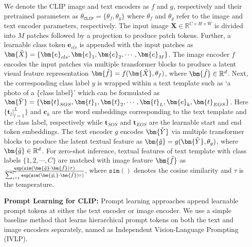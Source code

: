 \documentclass[10pt,twocolumn,letterpaper]{article}
\begin{document}
We denote the CLIP image and text encoders as ${f}$ and ${g}$, respectively and their pretrained parameters as ${\theta}_{\mathtt{CLIP}} = \{\theta_{f}, \theta_{g} \}$ where $\theta_{f}$ and $\theta_{g}$ refer to the image and text encoder parameters, respectively. The input image $\bm{X} \in \mathbb{R}^{C\times H\times W}$ is divided into $M$ patches followed by a projection to produce patch tokens.  Further, a learnable class token $\bm{e}_{cls}$ is appended with the input patches as $\bm{\Tilde{X}}= \{\bm{e}_{cls}, \bm{e}_{1}, \bm{e}_{2}, \cdots, \bm{e}_{M}\}$.
The image encoder ${f}$ encodes the input patches via multiple transformer blocks to produce a latent visual feature representation $\bm{\Tilde{f}} = f(\bm{\Tilde{X}}, \theta_{f})$, where $\bm{\Tilde{f}} \in  \mathbb{R}^{d}$. Next, the corresponding class label ${y}$ is wrapped within a text template %
such as ‘a photo of a \{class label\}’ which can be formulated as $\bm{\Tilde{Y}}=\{\bm{t}_{SOS}, \bm{t}_{1}, \bm{t}_{2}, \cdots, \bm{t}_{L}, \bm{c}_{k}, \bm{t}_{EOS}\}$. Here $\{\bm{t}_l|_{l=1}^{L}\}$ and $\bm{c}_{k}$ are the word embeddings corresponding to the text template %
and the class label, respectively while $\bm{t}_{SOS}$  and  $\bm{t}_{EOS}$ are the learnable start and end token embeddings. The text encoder ${g}$ encodes $\bm{\Tilde{Y}}$ via multiple transformer blocks to produce the latent textual feature as $\bm{\Tilde{g}} = g(\bm{\Tilde{Y}}, \theta_{g})$, where $\bm{\Tilde{g}} \in  \mathbb{R}^{d}$. For zero-shot inference, textual features of text template %
with class labels $\{1, 2, \cdots, C\}$
are matched with image feature $\bm{\Tilde{f}}$ as $\frac{\mathtt{exp}(\mathtt{sim}(\bm{\Tilde{g}} \cdot \bm{\Tilde{f}})\tau)}{\sum_{i=1}^{C}\mathtt{exp}(\mathtt{sim}(\bm{\Tilde{g_i}} \cdot \bm{\Tilde{f}})\tau)}$, where $\mathtt{sim}()$ denotes the cosine similarity and $\tau$ is the temperature.


\noindent \textbf{Prompt Learning for CLIP:} Prompt learning approaches append learnable prompt tokens at either the text \cite{zhou2022learning, zhou2022conditional} encoder or image \cite{bahng2022visual} encoder. We use a simple baseline method \cite{rasheed2023fine} that learns hierarchical prompt tokens on both the text and image encoders separately, named as Independent Vision-Language Prompting (IVLP).
\end{document}
